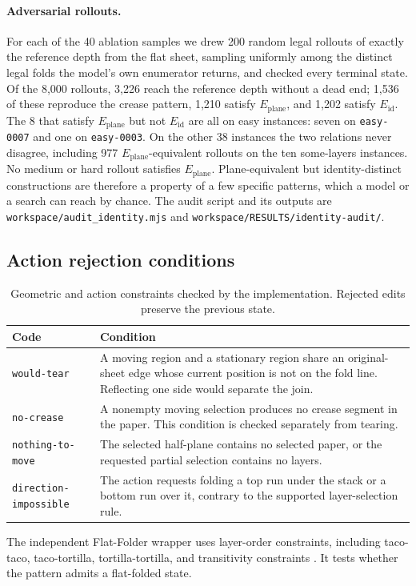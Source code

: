 \paragraph{Adversarial rollouts.} For each of the 40 ablation samples we drew 200 random legal
rollouts of exactly the reference depth from the flat sheet, sampling uniformly among the
distinct legal folds the model's own enumerator returns, and checked every terminal state.
Of the 8,000 rollouts, 3,226 reach the reference depth without a dead end; 1,536 of these
reproduce the crease pattern, 1,210 satisfy $E_{\mathrm{plane}}$, and 1,202 satisfy $E_{\mathrm{id}}$.
The 8 that satisfy $E_{\mathrm{plane}}$ but not $E_{\mathrm{id}}$ are all on easy instances: seven on
\texttt{easy-0007} and one on \texttt{easy-0003}. On the other 38 instances the two relations never
disagree, including 977 $E_{\mathrm{plane}}$-equivalent rollouts on the ten some-layers instances. No
medium or hard rollout satisfies $E_{\mathrm{plane}}$. Plane-equivalent but identity-distinct
constructions are therefore a property of a few specific patterns, which a model or a search can
reach by chance.
The audit script and its outputs are \texttt{workspace/audit\_identity.mjs} and
\texttt{workspace/RESULTS/identity-audit/}.

\subsection{Action rejection conditions}
\label{app:action-errors}
\begin{table}[h]
\centering
\caption{Geometric and action constraints checked by the implementation. Rejected edits preserve
 the previous state.}
\begin{tabular}{lp{.63\linewidth}}
\hline
Code & Condition \\
\hline
\texttt{would-tear} & A moving region and a stationary region share an original-sheet edge
whose current position is not on the fold line. Reflecting one side would separate the join. \\
\texttt{no-crease} & A nonempty moving selection produces no crease segment in the paper.
This condition is checked separately from tearing. \\
\texttt{nothing-to-move} & The selected half-plane contains no selected paper, or the requested
partial selection contains no layers. \\
\texttt{direction-impossible} & The action requests folding a top run under the stack or a bottom
run over it, contrary to the supported layer-selection rule. \\
\hline
\end{tabular}
\end{table}

The independent Flat-Folder wrapper uses layer-order constraints, including taco-taco,
taco-tortilla, tortilla-tortilla, and transitivity constraints
\citep{akitaya-flatfolder,flatfolder}.
It tests whether the pattern admits a flat-folded state.
